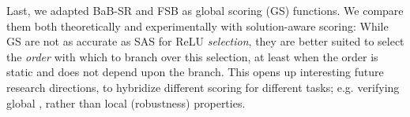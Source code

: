 \documentclass{llncs}
\begin{document}
Last, we adapted BaB-SR \cite{BaB} and FSB \cite{FSB} as global scoring (GS) functions. 
We compare them both theoretically and experimentally with solution-aware scoring: While GS are not as accurate as SAS for ReLU {\em selection}, they are better suited to select the {\em order} with which to branch over this selection, at least when the order is static and does not depend upon the branch. This opens up interesting future research directions, to hybridize different scoring for different tasks;  e.g. verifying global \cite{lipshitz}, \cite{sensing} rather than local (robustness) properties.





\newpage






\bigskip

\appendix


\end{document}
